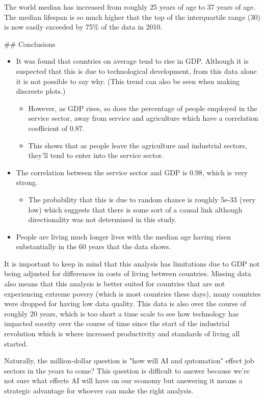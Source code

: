 \documentclass[11pt]{article}
\providecommand{\tightlist}{%
      \setlength{\itemsep}{0pt}\setlength{\parskip}{0pt}}
\begin{document}
    The world median has increased from roughly 25 years of age to 37 years
of age. The median lifespan is so much higher that the top of the
interquartile range (30) is now easily exceeded by 75\% of the data in
2010.

     \#\# Conclusions

    \begin{itemize}
\item
  It was found that countries on average tend to rise in GDP. Although
  it is suspected that this is due to technological development, from
  this data alone it is not possible to say why. (This trend can also be
  seen when making discreete plots.)

  \begin{itemize}
  \item
    However, as GDP rises, so does the percentage of people employed in
    the service sector, away from service and agriculture which have a
    correlation coefficient of 0.87.
  \item
    This shows that as people leave the agriculture and industrial
    sectors, they'll tend to enter into the service sector.
  \end{itemize}
\item
  The correlation between the service sector and GDP is 0.98, which is
  very strong.

  \begin{itemize}
  \tightlist
  \item
    The probability that this is due to random chance is roughly 5e-33
    (very low) which suggests that there is some sort of a causal link
    although directionality was not determined in this study.
  \end{itemize}
\item
  People are living much longer lives with the median age having risen
  substantially in the 60 years that the data shows.
\end{itemize}

It is important to keep in mind that this analysis has limitations due
to GDP not being adjusted for differences in costs of living between
countries. Missing data also means that this analysis is better suited
for countries that are not experiencing extreme povery (which is most
countries these days), many countries were dropped for having low data
quality. This data is also over the course of roughly 20 years, which is
too short a time scale to see how technology has impacted soceity over
the course of time since the start of the industrial revolution which is
where increased productivity and standards of living all started.

Naturally, the million-dollar question is "how will AI and qutomation"
effect job sectors in the years to come? This question is difficult to
answer because we're not sure what effects AI will have on our economy
but answering it means a strategic advantage for whoever can make the
right analysis.


    
    
    
    
\end{document}
